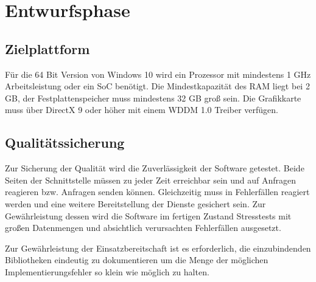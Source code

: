 \section{Entwurfsphase}
\label{sec:Entwurfsphase}

\subsection{Zielplattform}
\label{sec:Zielplattform}
Für die 64 Bit Version von Windows 10 wird ein Prozessor mit mindestens 1 GHz Arbeitsleistung oder ein {\acs{SoC}} benötigt. Die Mindestkapazität des RAM liegt bei 2 GB, der Festplattenspeicher muss mindestens 32 GB groß sein. Die Grafikkarte muss über DirectX 9 oder höher mit einem {\acs{WDDM}} 1.0 Treiber verfügen.

\subsection{Qualitätssicherung}
\label{sec:Qualitätssicherung}
Zur Sicherung der Qualität wird die Zuverlässigkeit der Software getestet. Beide Seiten der Schnittstelle müssen zu jeder Zeit erreichbar sein und auf Anfragen reagieren bzw. Anfragen senden können. Gleichzeitig muss in Fehlerfällen reagiert werden und eine weitere Bereitstellung der Dienste gesichert sein. Zur Gewährleistung dessen wird die Software im fertigen Zustand Stresstests mit großen Datenmengen und absichtlich verursachten Fehlerfällen ausgesetzt. 

Zur Gewährleistung der Einsatzbereitschaft ist es erforderlich, die einzubindenden Bibliotheken eindeutig zu dokumentieren um die Menge der möglichen Implementierungsfehler so klein wie möglich zu halten.